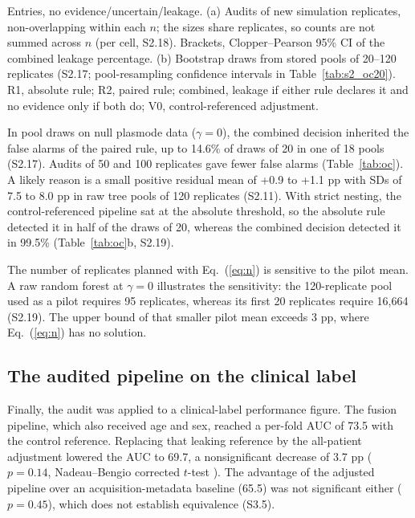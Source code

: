 \documentclass[final,1p,times]{elsarticle}
\newcommand{\tabref}[1]{Table~\ref{#1}}
\renewcommand{\eqref}[1]{Eq.~(\ref{#1})}
\begin{document}
\begin{table}[!htb]
\vspace{2pt}
\begin{minipage}{\textwidth}\footnotesize
Entries, no evidence/uncertain/leakage. (a) Audits of new simulation replicates, non-overlapping within each $n$; the sizes share replicates, so counts are not summed across $n$ (per cell, S2.18). Brackets, Clopper--Pearson 95\% CI of the combined leakage percentage. (b) Bootstrap draws from stored pools of 20--120 replicates (S2.17; pool-resampling confidence intervals in \tabref{tab:s2_oc20}). R1, absolute rule; R2, paired rule; combined, leakage if either rule declares it and no evidence only if both do; V0, control-referenced adjustment.
\end{minipage}
\end{table}%

In pool draws on null plasmode data ($\gamma=0$), the combined decision inherited the false alarms of the paired rule, up to 14.6\% of draws of 20 in one of 18 pools (S2.17). Audits of 50 and 100 replicates gave fewer false alarms (\tabref{tab:oc}). A likely reason is a small positive residual mean of +0.9 to +1.1 pp with SDs of 7.5 to 8.0 pp in raw tree pools of 120 replicates (S2.11). With strict nesting, the control-referenced pipeline sat at the absolute threshold, so the absolute rule detected it in half of the draws of 20, whereas the combined decision detected it in 99.5\% (\tabref{tab:oc}b, S2.19).

The number of replicates planned with \eqref{eq:n} is sensitive to the pilot mean. A raw random forest at $\gamma=0$ illustrates the sensitivity: the 120-replicate pool used as a pilot requires 95 replicates, whereas its first 20 replicates require 16,664 (S2.19). The upper bound of that smaller pilot mean exceeds 3 pp, where \eqref{eq:n} has no solution.

\subsection{The audited pipeline on the clinical label}\label{sec:kinerja}

Finally, the audit was applied to a clinical-label performance figure. The fusion pipeline, which also received age and sex, reached a per-fold AUC of 73.5 with the control reference. Replacing that leaking reference by the all-patient adjustment lowered the AUC to 69.7, a nonsignificant decrease of 3.7 pp ($p = 0.14$, Nadeau--Bengio corrected $t$-test \cite{nadeau2003}). The advantage of the adjusted pipeline over an acquisition-metadata baseline (65.5) was not significant either ($p = 0.45$), which does not establish equivalence (S3.5).%
\end{document}
